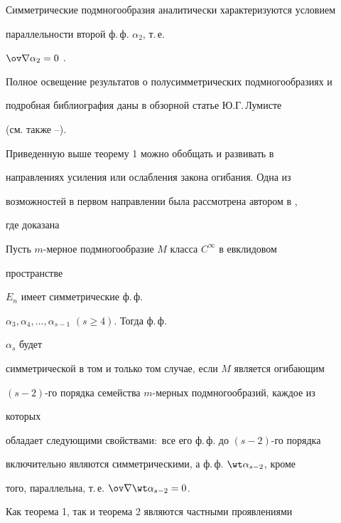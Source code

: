 Симметрические подмногообразия аналитически характеризуются условием 


параллельности второй ф.\,ф. $\alpha_2$, т.\,е. 


$\ov\nabla\alpha_2=0$ \cite{2}. 


 


Полное освещение результатов о полусимметрических подмногообразиях и 


подробная библиография даны в обзорной статье Ю.Г.\,Лумисте \cite{4} 


(см. также \cite{5}--\cite{8}). 


 


Приведенную выше теорему 1 можно обобщать и развивать в


направлениях усиления или ослабления закона огибания. Одна из 


возможностей в первом направлении была рассмотрена автором  в \cite{9},


где доказана 


 


\begin{thm} 


Пусть $m$-мерное подмногообразие $M$ класса $C^\infty$ в евклидовом 


пространстве 


$E_n$ имеет симметрические ф.\,ф. 


$\alpha_3,\alpha_4,\dotsc,\alpha_{s-1}$ $(s\ge 4)$. Тогда ф.\,ф. 


$\alpha_s$ будет 


симметрической в том и только том случае, если $M$ является огибающим 


$(s-2)$-го порядка семейства $m$-мерных подмногообразий, каждое из 


которых 


обладает следующими свойствами$:$ все его ф.\,ф. до $(s-2)$-го порядка 


включительно являются симметрическими, а ф.\,ф. $\wt\alpha_{s-2}$, кроме 


того, параллельна, т.\,е. $\ov\nabla\wt\alpha_{s-2}=0$. 


\end{thm} 


 


Как теорема 1, так и теорема 2 являются частными проявлениями


